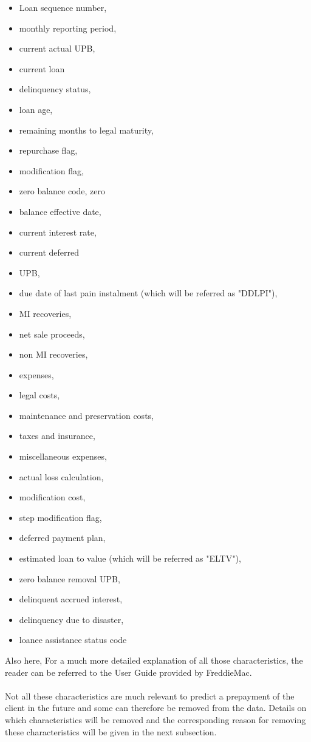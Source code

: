     \begin{itemize}
        \item Loan sequence number,
        \item monthly reporting period, 
        \item current actual UPB, 
        \item current loan 
        \item delinquency status, 
        \item loan age, 
        \item remaining months to legal maturity, 
        \item repurchase flag, 
        \item modification flag, 
        \item zero balance code, zero 
        \item balance effective date, 
        \item current interest rate, 
        \item current deferred 
        \item UPB, 
        \item due date of last pain instalment (which will be referred as "DDLPI"), 
        \item MI recoveries, 
        \item net sale  proceeds, 
        \item non MI recoveries, 
        \item expenses, 
        \item legal costs, 
        \item maintenance and preservation costs, 
        \item taxes and insurance, 
        \item miscellaneous expenses, 
        \item actual loss calculation, 
        \item modification cost, 
        \item step modification flag,
        \item deferred payment plan,
        \item estimated loan to value (which will be referred as "ELTV"), 
        \item zero balance removal UPB, 
        \item delinquent accrued interest, 
        \item delinquency due to disaster, 
        \item loanee assistance status code
    \end{itemize}
    Also here, For a much more detailed explanation of all those characteristics,
    the reader can be referred to the User Guide provided by FreddieMac.
    \\\\        
    Not all these characteristics are much relevant to predict a prepayment of the 
    client in the future and some can therefore be removed from the data. 
    Details on which characteristics will be removed and the corresponding 
    reason for removing these characteristics will be given in the next subsection.

